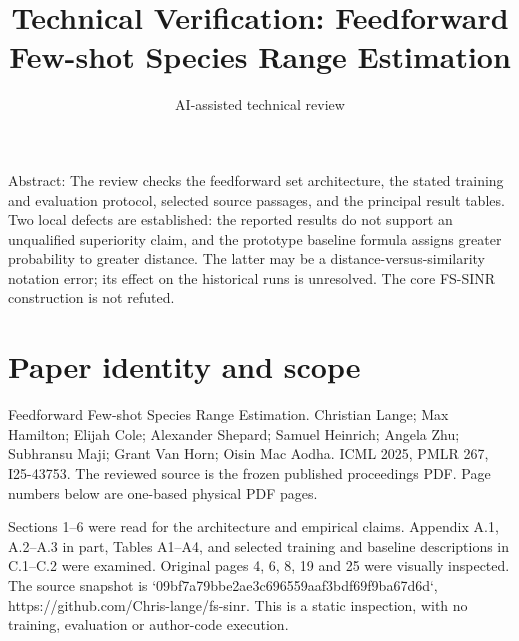 \documentclass[10pt]{article}
\title{Technical Verification: Feedforward Few-shot Species Range Estimation}
\author{AI-assisted technical review}
\date{}
\begin{document}
\maketitle
Abstract: The review checks the feedforward set architecture, the stated training and evaluation protocol, selected source passages, and the principal result tables. Two local defects are established: the reported results do not support an unqualified superiority claim, and the prototype baseline formula assigns greater probability to greater distance. The latter may be a distance-versus-similarity notation error; its effect on the historical runs is unresolved. The core FS-SINR construction is not refuted.\par
\section*{Paper identity and scope}
Feedforward Few-shot Species Range Estimation. Christian Lange; Max Hamilton; Elijah Cole; Alexander Shepard; Samuel Heinrich; Angela Zhu; Subhransu Maji; Grant Van Horn; Oisin Mac Aodha. ICML 2025, PMLR 267, I25-43753. The reviewed source is the frozen published proceedings PDF. Page numbers below are one-based physical PDF pages.\par
Sections 1–6 were read for the architecture and empirical claims. Appendix A.1, A.2–A.3 in part, Tables A1–A4, and selected training and baseline descriptions in C.1–C.2 were examined. Original pages 4, 6, 8, 19 and 25 were visually inspected. The source snapshot is `09bf7a79bbe2ae3c696559aaf3bdf69f9ba67d6d`, https://github.com/Chris-lange/fs-sinr. This is a static inspection, with no training, evaluation or author-code execution.\par
\end{document}
